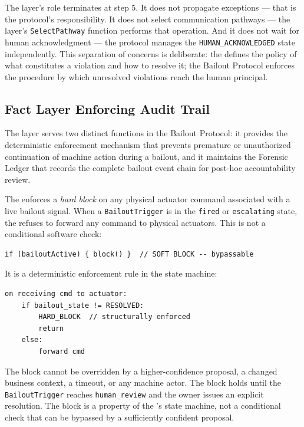 The \bounds{} layer's role terminates at step 5. It does not propagate exceptions — that is the protocol's responsibility. It does not select communication pathways — the \fact{} layer's \texttt{SelectPathway} function performs that operation. And it does not wait for human acknowledgment — the protocol manages the \texttt{HUMAN\_ACKNOWLEDGED} state independently. This separation of concerns is deliberate: the \bounds{} defines the policy of what constitutes a violation and how to resolve it; the Bailout Protocol enforces the procedure by which unresolved violations reach the human principal.

\subsection{Fact Layer Enforcing Audit Trail}
\label{sec:fact-enforcement}

The \fact{} layer serves two distinct functions in the Bailout Protocol: it provides the deterministic enforcement mechanism that prevents premature or unauthorized continuation of machine action during a bailout, and it maintains the Forensic Ledger that records the complete bailout event chain for post-hoc accountability review.

The \fact{} enforces a \textit{hard block} on any physical actuator command associated with a live bailout signal. When a \texttt{BailoutTrigger} is in the \texttt{fired} or \texttt{escalating} state, the \fact{} refuses to forward any \bounds{} command to physical actuators. This is not a conditional software check:

\begin{verbatim}
if (bailoutActive) { block() }  // SOFT BLOCK -- bypassable
\end{verbatim}

It is a deterministic enforcement rule in the \fact{} state machine:

\begin{verbatim}
on receiving cmd to actuator:
    if bailout_state != RESOLVED:
        HARD_BLOCK  // structurally enforced
        return
    else:
        forward cmd
\end{verbatim}

The block cannot be overridden by a higher-confidence \bounds{} proposal, a changed business context, a timeout, or any machine actor. The block holds until the \texttt{BailoutTrigger} reaches \texttt{human\_review} and the \purpose{} owner issues an explicit resolution. The block is a property of the \fact{}'s state machine, not a conditional check that can be bypassed by a sufficiently confident proposal.

